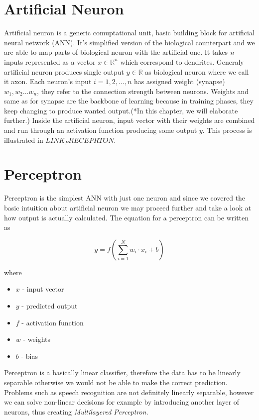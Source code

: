 \section{Artificial Neuron}

Artificial neuron is a generic comuptational unit, basic building block for artificial neural network (ANN).
It's simplified version of the biological counterpart and we are able to map parts of biological neuron with the artificial one.
It takes \textit{n} inputs represented as a vector $x\in\mathbb{R}^n$ which correspond to dendrites.
Generaly artificial neuron produces single output $y\in\mathbb{R}$ as biological neuron where we call it axon.
Each neuron's input $i=1,2,\ldots, n$ has assigned weight (synapse) $w_1, w_2 \ldots w_n$, they refer to the connection strength between neurons.
Weights and same as for synapse are the backbone of learning because in training phases, they keep changing to produce wanted output.(*In this chapter, we will elaborate further.)
Inside the artificial neuron, input vector with their weights are combined and run through an activation function producing some output $y$.
This process is illustrated in $LINK_PRECEPRTON$.


\section{Perceptron}

Perceptron is the simplest ANN with just one neuron and since we covered the basic intuition about artificial neuron we may proceed further and take a look at how output is actually calculated.
The equation for a perceptron can be written as

\[ y = f(\sum_{i=1}^N w_i \cdot x_i + b) \]

where

\begin{itemize}
	\item $x$ - input vector
	\item $y$ - predicted output
  \item $f$ - activation function
	\item $w$ - weights
	\item $b$ - bias
\end{itemize}

Perceptron is a basically linear classifier, therefore the data has to be linearly separable otherwise we would not be able to make the correct prediction.
Problems such as speech recognition are not definitely linearly separable, however we can solve non-linear decisions for example by introducing another layer of neurons, thus creating \textit{Multilayered Perceptron}.

